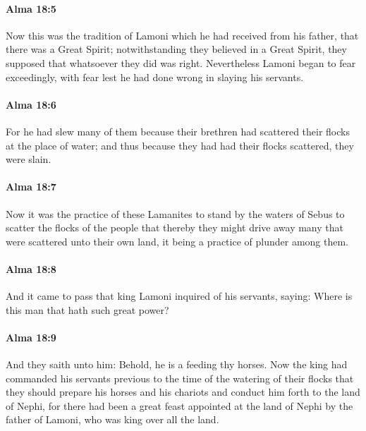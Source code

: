 		\paragraph{Alma 18:5} %
			\label{ALMA-18-5}

			Now this was the tradition of Lamoni which he had received from his father,
			that there was a Great Spirit;
			notwithstanding they believed in a Great Spirit,
			they supposed that whatsoever they did was right.
			Nevertheless Lamoni began to fear exceedingly,
			with fear lest he had done wrong in slaying his servants.

		\paragraph{Alma 18:6} %
			\label{ALMA-18-6}

			For he had slew many of them
			because their brethren had scattered their flocks at the place of water;
			and thus because they had had their flocks scattered,
			they were slain.

		\paragraph{Alma 18:7} %
			\label{ALMA-18-7}

			Now it was the practice of these Lamanites
			to stand by the waters of Sebus to scatter the flocks of the people
			that thereby they might drive away many that were scattered unto their own land,
			it being a practice of plunder among them.

		\paragraph{Alma 18:8} %
			\label{ALMA-18-8}

			And it came to pass that king Lamoni inquired of his servants, saying:
			Where is this man that hath such great power?

		\paragraph{Alma 18:9} %
			\label{ALMA-18-9}

			And they saith unto him:
			Behold, he is a feeding thy horses.
			Now the king had commanded his servants
			previous to the time of the watering of their flocks
			that they should prepare his horses and his chariots
			and conduct him forth to the land of Nephi,
			for there had been a great feast appointed at the land of Nephi
			by the father of Lamoni, who was king over all the land.

